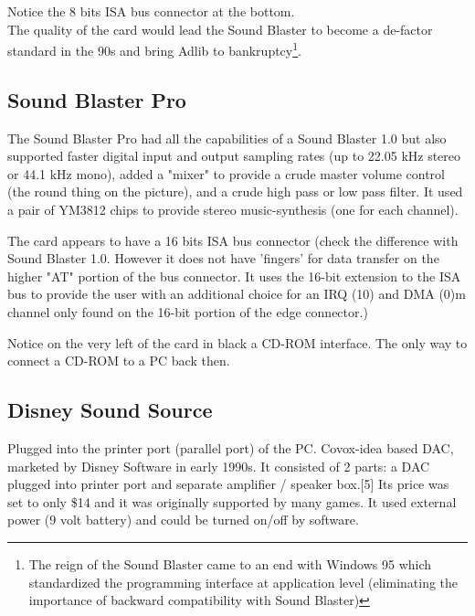 \documentclass[book.tex]{subfiles}
\begin{document}
\begin{figure}[H] 
  \centering 
\end{figure}
 Notice the 8 bits ISA bus connector at the bottom.\\
   The quality of the card would lead the Sound Blaster to become a de-factor standard in the 90s and bring Adlib to bankruptcy\footnote{The reign of the Sound Blaster came to an end with Windows 95 which standardized the programming interface at application level (eliminating the importance of backward compatibility with Sound Blaster)}.


  \subsection{Sound Blaster Pro}
The Sound Blaster Pro had all the capabilities of a Sound Blaster 1.0 but also supported faster digital input and output sampling rates (up to 22.05 kHz stereo or 44.1 kHz mono), added a "mixer" to provide a crude master volume control (the round thing on the picture), and a crude high pass or low pass filter. It used a pair of YM3812 chips to provide stereo music-synthesis (one for each channel).\\
\begin{figure}[H] 
  \centering 
\end{figure}
 The card appears to have a 16 bits ISA bus connector (check the difference with Sound Blaster 1.0. However it does not have 'fingers' for data transfer on the higher "AT" portion of the bus connector. It uses the 16-bit extension to the ISA bus to provide the user with an additional choice for an IRQ (10) and DMA (0)m channel only found on the 16-bit portion of the edge connector.)\\
\par
{} Notice on the very left of the card in black a CD-ROM interface. The only way to connect a CD-ROM to a PC back then.


  \subsection{Disney Sound Source}
  Plugged into the printer port (parallel port) of the PC. Covox-idea based DAC, marketed by Disney Software in early 1990s. It consisted of 2 parts: a DAC plugged into printer port and separate amplifier / speaker box.[5] Its price was set to only \$14 and it was originally supported by many games. It used external power (9 volt battery) and could be turned on/off by software.\\
  \par
  \begin{figure}[H] 
    \centering 
  \end{figure}
\end{document}
